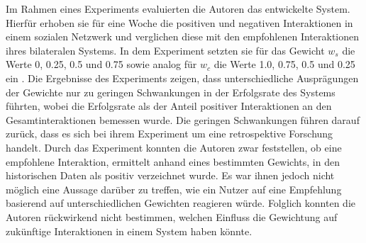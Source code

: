 Im Rahmen eines Experiments evaluierten die Autoren das entwickelte System.
Hierfür erhoben sie für eine Woche die positiven und negativen Interaktionen in einem sozialen Netzwerk und verglichen diese mit den empfohlenen Interaktionen ihres bilateralen Systems.
In dem Experiment setzten sie für das Gewicht $w_{s}$ die Werte 0, 0.25, 0.5 und 0.75 sowie analog für $w_{c}$ die Werte 1.0, 0.75, 0.5 und 0.25 ein \cite[S. 251]{kim:2:inproceedings}.
Die Ergebnisse des Experiments zeigen, dass unterschiedliche Ausprägungen der Gewichte nur zu geringen Schwankungen in der Erfolgsrate des Systems führten, wobei die Erfolgsrate als der Anteil positiver Interaktionen an den Gesamtinteraktionen bemessen wurde.
Die geringen Schwankungen führen \textcite[S. 219]{kim:2:inproceedings} darauf zurück, dass es sich bei ihrem Experiment um eine retrospektive Forschung handelt.
Durch das Experiment konnten die Autoren zwar feststellen, ob eine empfohlene Interaktion, ermittelt anhand eines bestimmten Gewichts, in den historischen Daten als positiv verzeichnet wurde.
Es war ihnen jedoch nicht möglich eine Aussage darüber zu treffen, wie ein Nutzer auf eine Empfehlung basierend auf unterschiedlichen Gewichten reagieren würde.
Folglich konnten die Autoren rückwirkend nicht bestimmen, welchen Einfluss die Gewichtung auf zukünftige Interaktionen in einem System haben könnte.

